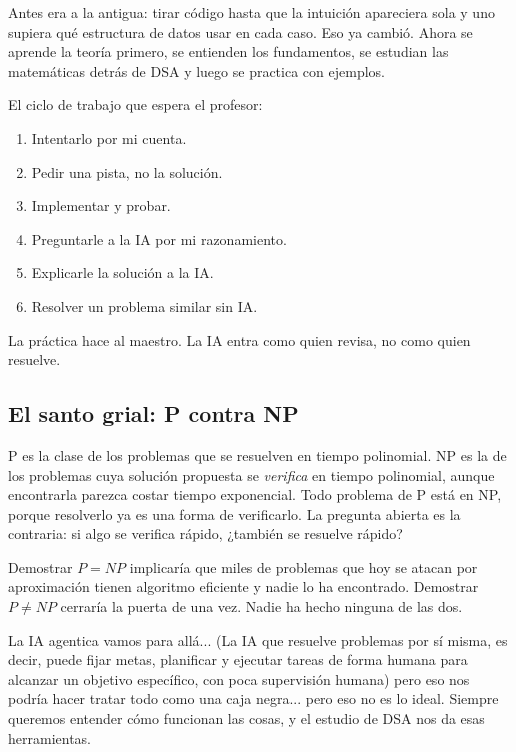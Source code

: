 \documentclass[11pt,letterpaper]{article}
\begin{document}
Antes era a la antigua: tirar código hasta que la intuición apareciera
sola y uno supiera qué estructura de datos usar en cada caso. Eso ya
cambió. Ahora se aprende la teoría primero, se entienden los
fundamentos, se estudian las matemáticas detrás de DSA y luego se
practica con ejemplos.

El ciclo de trabajo que espera el profesor:

\begin{enumerate}[itemsep=0.1em]
    \item Intentarlo por mi cuenta.
    \item Pedir una pista, no la solución.
    \item Implementar y probar.
    \item Preguntarle a la IA por mi razonamiento.
    \item Explicarle la solución a la IA.
    \item Resolver un problema similar sin IA.
\end{enumerate}

\begin{idea}
  La práctica hace al maestro. La IA entra como quien revisa, no como
  quien resuelve.
\end{idea}


\subsection*{El santo grial: P contra NP}

P es la clase de los problemas que se resuelven en tiempo polinomial.
NP es la de los problemas cuya solución propuesta se \emph{verifica} en
tiempo polinomial, aunque encontrarla parezca costar tiempo
exponencial. Todo problema de P está en NP, porque resolverlo ya es una
forma de verificarlo. La pregunta abierta es la contraria: si algo se
verifica rápido, ¿también se resuelve rápido?

Demostrar $P = NP$ implicaría que miles de problemas que hoy se atacan
por aproximación tienen algoritmo eficiente y nadie lo ha encontrado.
Demostrar $P \neq NP$ cerraría la puerta de una vez. Nadie ha hecho
ninguna de las dos.

La IA agentica vamos para allá... (La IA que resuelve problemas por sí misma, es decir,
puede fijar metas, planificar y ejecutar tareas de forma humana para alcanzar un objetivo 
específico, con poca supervisión humana) pero eso nos podría hacer tratar todo como una caja negra... pero eso no es lo ideal.
Siempre queremos entender cómo funcionan las cosas, y el estudio de DSA nos da esas herramientas.
\end{document}

